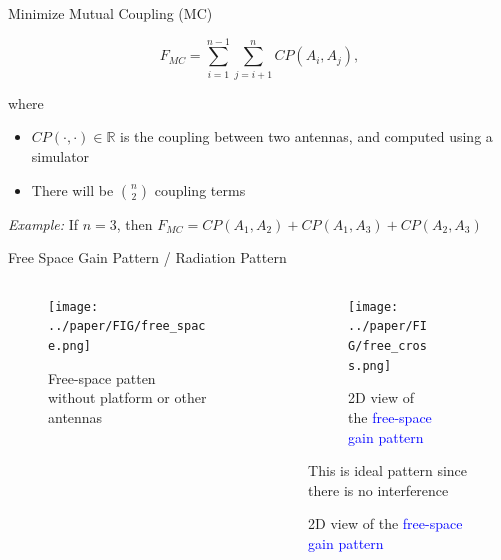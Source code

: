 \documentclass{beamer}
\begin{document}
\begin{frame}{Minimize Mutual Coupling (MC)}
    \begin{tcolorbox}[colback=green!5]
        \begin{equation}
            F_{MC} = \sum_{i=1}^{n-1}\sum_{j=i+1}^{n} CP(A_i, A_j),
        \end{equation}
    \end{tcolorbox}
    where
    \begin{itemize}
        \item $CP(\cdot, \cdot) \in \mathbb R$ is the coupling between two antennas, and computed using a simulator
        \item There will be $n \choose 2$ coupling terms 
    \end{itemize}
    \vspace{2mm}
    \small\textit{Example:} If $n=3$, then $F_{MC} = CP(A_1, A_2) + CP(A_1, A_3) + CP(A_2, A_3)$
\end{frame}

\begin{frame}{Free Space Gain Pattern / Radiation Pattern}
    \begin{columns}
        \begin{column}{0.5\linewidth}
            \begin{figure}
                \vspace{-2.5cm}
                \centering
                \texttt{[image: ../paper/FIG/free\_space.png]}
                \caption*{\tiny Free-space patten without platform or other antennas}
            \end{figure}
        \end{column}
        \begin{column}{0.5\linewidth}
            \begin{overlayarea}{\textwidth}{\textheight}
                \begin{figure}
                    \begin{subfigure}{\columnwidth}
                        \centering
                        \texttt{[image: ../paper/FIG/free\_cross.png]}
                        \caption*{\tiny 2D view of the \textcolor{blue}{free-space gain pattern}}%
                    \end{subfigure}\vspace*{2mm}
                    \begin{tcolorbox}[colback=green!5]
                        \centering
                        This is ideal pattern since there is no interference
                    \end{tcolorbox}
                \end{figure}
            \end{overlayarea}
        \end{column}
    \end{columns}
\end{frame}
\end{document}
